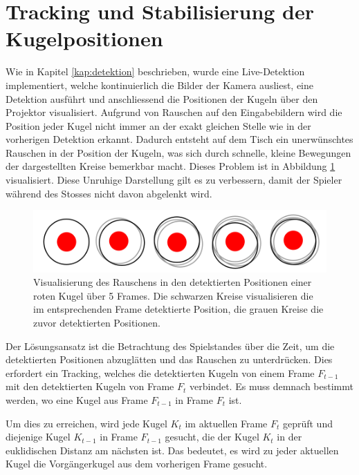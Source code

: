 \section{Tracking und Stabilisierung der Kugelpositionen}\label{kap:tracking}
Wie in Kapitel \ref{kap:detektion} beschrieben, wurde eine Live-Detektion implementiert, welche kontinuierlich
die Bilder der Kamera ausliest, eine Detektion ausführt und anschliessend die Positionen der Kugeln über den Projektor
visualisiert.
Aufgrund von Rauschen auf den Eingabebildern wird die Position jeder Kugel nicht immer an der exakt gleichen Stelle wie
in der vorherigen Detektion erkannt. Dadurch entsteht auf dem Tisch ein unerwünschtes Rauschen in der Position der Kugeln,
was sich durch schnelle, kleine Bewegungen der dargestellten Kreise bemerkbar macht.
Dieses Problem ist in Abbildung \ref{fig:tracking_detected_positions_over_time} visualisiert.
Diese Unruhige Darstellung gilt es zu verbessern, damit der Spieler während des Stosses nicht davon abgelenkt wird.

\begin{figure}[h!]
    \begin{center}
        \includegraphics[width=0.6\linewidth]{../common/03_billiard_ai/resources/tracking_detected_positions_over_time.png}
    \end{center}
    \caption{Visualisierung des Rauschens in den detektierten Positionen einer roten Kugel über 5 Frames. Die schwarzen Kreise visualisieren die im entsprechenden Frame detektierte Position, die grauen Kreise die zuvor detektierten Positionen.}
    \label{fig:tracking_detected_positions_over_time}
\end{figure}

Der Lösungsansatz ist die Betrachtung des Spielstandes über die Zeit, um die detektierten Positionen abzuglätten und
das Rauschen zu unterdrücken.
Dies erfordert ein Tracking, welches die detektierten Kugeln von einem Frame $F_{t-1}$ mit den detektierten Kugeln
von Frame $F_{t}$ verbindet. Es muss demnach bestimmt werden, wo eine Kugel aus Frame $F_{t-1}$ in Frame $F_{t}$ ist.

Um dies zu erreichen, wird jede Kugel $K_{t}$ im aktuellen Frame $F_{t}$ geprüft und diejenige Kugel $K_{t-1}$
in Frame $F_{t-1}$ gesucht, die der Kugel $K_{t}$ in der euklidischen Distanz am nächsten ist.
Das bedeutet, es wird zu jeder aktuellen Kugel die Vorgängerkugel aus dem vorherigen Frame gesucht.

